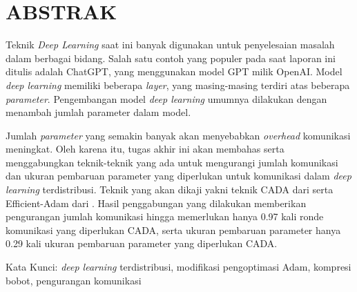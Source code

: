 \clearpage
\chapter*{ABSTRAK}

Teknik \emph{Deep Learning} saat ini banyak digunakan untuk penyelesaian masalah dalam berbagai bidang. Salah satu contoh yang populer pada saat laporan ini ditulis adalah ChatGPT, yang menggunakan model GPT milik OpenAI. Model \emph{deep learning} memiliki beberapa \emph{layer}, yang masing-masing terdiri atas beberapa \emph{parameter}. Pengembangan model \emph{deep learning} umumnya dilakukan dengan menambah jumlah parameter dalam model.

Jumlah \emph{parameter} yang semakin banyak akan menyebabkan \emph{overhead} komunikasi meningkat. Oleh karena itu, tugas akhir ini akan membahas serta menggabungkan teknik-teknik yang ada untuk mengurangi jumlah komunikasi dan ukuran pembaruan parameter yang diperlukan untuk komunikasi dalam \emph{deep learning} terdistribusi. Teknik yang akan dikaji yakni teknik CADA dari \textcite{Chen2021CADA} serta Efficient-Adam dari \textcite{Chen2022Efficient}. Hasil penggabungan yang dilakukan memberikan pengurangan jumlah komunikasi hingga memerlukan hanya 0.97 kali ronde komunikasi yang diperlukan CADA, serta ukuran pembaruan parameter hanya 0.29 kali ukuran pembaruan parameter yang diperlukan CADA.

Kata Kunci: \emph{deep learning} terdistribusi, modifikasi pengoptimasi Adam, kompresi bobot, pengurangan komunikasi
\clearpage
